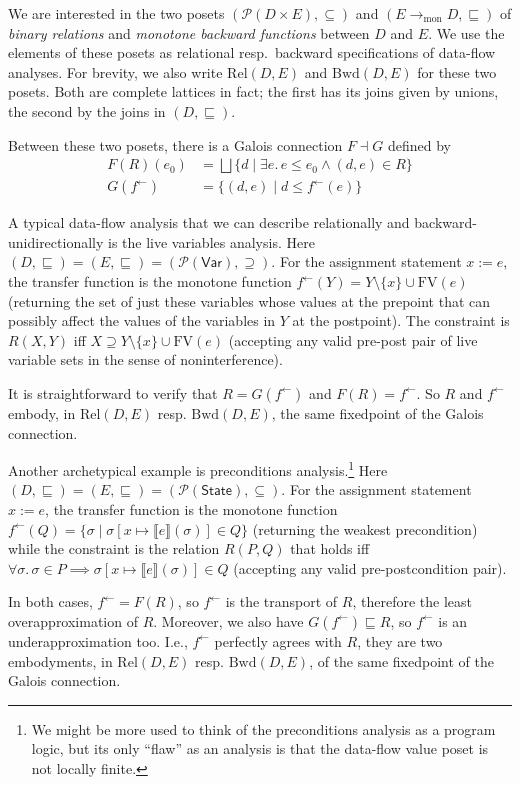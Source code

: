 \documentclass{llncs}
\newcommand{\Pow}{\mathcal{P}}
\newcommand{\Rel}{\mathrm{Rel}}
\newcommand{\Bwd}{\mathrm{Bwd}}
\newcommand{\tomon}{\to_{\mathrm{mon}}}
\newcommand{\fb}{{f^{\leftarrow}}}
\newcommand{\bigjoin}{\bigsqcup}
\newcommand{\Var}{\mathsf{Var}}
\newcommand{\State}{\mathsf{State}}
\newcommand{\FV}{\mathrm{FV}}
\newcommand{\sqleq}{\sqsubseteq}
\begin{document}
We are interested in the two posets $(\Pow(D \times E), \subseteq)$ and
$(E \tomon D, \sqleq)$ of \emph{binary relations} and \emph{monotone
  backward functions} between $D$ and $E$. We use the elements of
these posets as relational resp.\ backward specifications of data-flow
analyses. For brevity, we also write $\Rel(D, E)$ and $\Bwd(D, E)$
for these two posets. Both are complete lattices in fact; the first
has its joins given by unions, the second by the joins in
$(D, \sqleq)$.

Between these two posets, there is a Galois connection $F \dashv G$
defined by
\begin{align*}
    F (R)(e_{0}) &= \bigjoin \{ d \mid \exists e.\, e \leq e_{0}  \land (d , e) \in R \} \\
    G (\fb) &= \{ (d , e) \mid d \leq \fb(e) \}
\end{align*}

A typical data-flow analysis that we can describe relationally and
backward-unidirectionally is the live variables analysis. Here
$(D, \sqleq) = (E, \sqleq) = (\Pow(\Var), \supseteq)$. For the
assignment statement $x := e$, the transfer function is the monotone
function $\fb (Y) = Y \setminus \{x\} \cup \FV(e)$ (returning the set
of just these variables whose values at the prepoint that can possibly
affect the values of the variables in $Y$ at the postpoint).  The
constraint is $R(X,Y)$ iff $X \supseteq Y \setminus \{x\} \cup \FV(e)$
(accepting any valid pre-post pair of live variable sets in the sense
of noninterference).

It is straightforward to verify that $R = G(\fb)$ and $F(R) = \fb$.  So
$R$ and $\fb$ embody, in $\Rel(D,E)$ resp. $\Bwd(D,E)$, the same
fixedpoint of the Galois connection.

Another archetypical example is preconditions analysis.\footnote{We
  might be more used to think of the preconditions analysis as a
  program logic, but its only ``flaw'' as an analysis is that the
  data-flow value poset is not locally finite.}  Here
$(D, \sqleq) = (E, \sqleq) = (\Pow(\State), \subseteq)$. For the
assignment statement $x := e$, the transfer function is the monotone
function
$\fb (Q) = \{ \sigma \mid \sigma[x \mapsto \llbracket
e\rrbracket(\sigma)] \in Q \}$ (returning the weakest precondition)
while the constraint is the relation $R(P, Q)$ that holds iff
$\forall \sigma.\, \sigma \in P \implies \sigma[x \mapsto \llbracket
e\rrbracket(\sigma)] \in Q$ (accepting any valid pre-postcondition
pair).

In both cases, $\fb = F(R)$, so $\fb$ is the transport of $R$,
therefore the least overapproximation of $R$. Moreover, we also have
$G(\fb) \sqleq R$, so $\fb$ is an underapproximation too. I.e., $\fb$
perfectly agrees with $R$, they are two embodyments, in $\Rel(D,E)$
resp. $\Bwd(D,E)$, of the same fixedpoint of the Galois connection.
\end{document}
